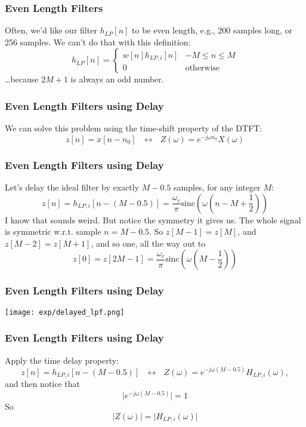 \documentclass{beamer}
\begin{document}
\begin{frame}
  \frametitle{Even Length Filters}

  Often, we'd like our filter $h_{LP}[n]$ to be even length, e.g., 200
  samples long, or 256 samples.  We can't do that with this definition:
  \[
  h_{LP}[n] = \begin{cases}
    w[n]h_{LP,i}[n] & -M\le n\le M\\
    0 &\mbox{otherwise}
  \end{cases}
  \]
  \ldots because $2M+1$ is always an odd number.
\end{frame}

\begin{frame}
  \frametitle{Even Length Filters using Delay}

  We can solve this problem using the time-shift property of the DTFT:
  \[
  z[n] = x[n-n_0]~~~\leftrightarrow~~~
  Z(\omega)=e^{-j\omega n_0}X(\omega)
  \]
\end{frame}
  
\begin{frame}
  \frametitle{Even Length Filters using Delay}

  Let's delay the ideal filter by exactly $M-0.5$ samples, for any
  integer $M$:
  \[
  z[n] = h_{LP,i}\left[n-(M-0.5)\right] =
  \frac{\omega_c}{\pi}\mbox{sinc}\left(\omega \left(n-M+\frac{1}{2}\right)\right)
  \]
  I know that sounds weird.  But notice the symmetry it gives us.  The whole signal is symmetric
  w.r.t. sample $n=M-0.5$.  So $z[M-1]=z[M]$, and $z[M-2]=z[M+1]$, and so one, all the way out to
  \begin{displaymath}
    z[0] = z[2M-1] =
    \frac{\omega_c}{\pi}\mbox{sinc}\left(\omega \left(M-\frac{1}{2}\right)\right)
  \end{displaymath}
\end{frame}

\begin{frame}
  \frametitle{Even Length Filters using Delay}
  
  \centerline{\texttt{[image: exp/delayed\_lpf.png]}}
\end{frame}
  
\begin{frame}
  \frametitle{Even Length Filters using Delay}

  Apply the time delay property:
  \[
  z[n] = h_{LP,i}\left[n-(M-0.5)\right]
  ~~~\leftrightarrow~~~
  Z(\omega)=e^{-j\omega (M-0.5)}H_{LP,i}(\omega),
  \]
  and then notice that
  \[
  \vert e^{-j\omega (M-0.5)}\vert = 1
  \]
  So
  \[
  \vert Z(\omega)\vert =\vert H_{LP,i}(\omega)\vert
  \]
\end{frame}
\end{document}
